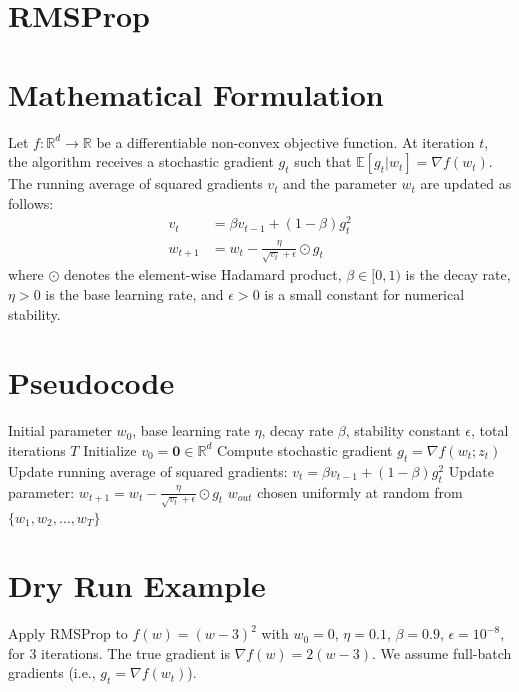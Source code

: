 \documentclass{article}
\begin{document}
\section*{RMSProp}
\section*{Mathematical Formulation}
Let $f: \mathbb{R}^d \to \mathbb{R}$ be a differentiable non-convex objective function. At iteration $t$, the algorithm receives a stochastic gradient $g_t$ such that $\mathbb{E}[g_t | w_t] = \nabla f(w_t)$. The running average of squared gradients $v_t$ and the parameter $w_t$ are updated as follows:
\begin{align}
    v_t &= \beta v_{t-1} + (1-\beta) g_t^2 \\
    w_{t+1} &= w_t - \frac{\eta}{\sqrt{v_t} + \epsilon} \odot g_t
\end{align}
where $\odot$ denotes the element-wise Hadamard product, $\beta \in [0, 1)$ is the decay rate, $\eta > 0$ is the base learning rate, and $\epsilon > 0$ is a small constant for numerical stability.

\section*{Pseudocode}
\begin{algorithm}[H]
\caption{RMSProp}
\begin{algorithmic}[1]
\REQUIRE Initial parameter $w_0$, base learning rate $\eta$, decay rate $\beta$, stability constant $\epsilon$, total iterations $T$
\STATE Initialize $v_0 = \mathbf{0} \in \mathbb{R}^d$
    \STATE Compute stochastic gradient $g_t = \nabla f(w_t; z_t)$
    \STATE Update running average of squared gradients: $v_t = \beta v_{t-1} + (1-\beta) g_t^2$
    \STATE Update parameter: $w_{t+1} = w_t - \frac{\eta}{\sqrt{v_t} + \epsilon} \odot g_t$
\ENDFOR
\OUTPUT $w_{out}$ chosen uniformly at random from $\{w_1, w_2, \dots, w_T\}$
\end{algorithmic}
\end{algorithm}

\section*{Dry Run Example}
Apply RMSProp to $f(w) = (w-3)^2$ with $w_0 = 0$, $\eta = 0.1$, $\beta = 0.9$, $\epsilon = 10^{-8}$, for 3 iterations.
The true gradient is $\nabla f(w) = 2(w-3)$. We assume full-batch gradients (i.e., $g_t = \nabla f(w_t)$).
\end{document}
